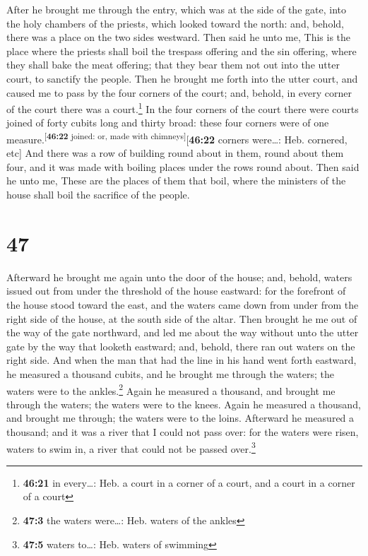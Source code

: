  After he brought me through the entry, which was at the
side of the gate, into the holy chambers of the priests, which looked
toward the north: and, behold, there was a place on the two sides
westward.  Then said he unto me, This is the place where
the priests shall boil the trespass offering and the sin offering, where
they shall bake the meat offering; that they bear them not out into the
utter court, to sanctify the people.  Then he brought me
forth into the utter court, and caused me to pass by the four corners of
the court; and, behold, in every corner of the court there was a
court.\footnote{\textbf{46:21} in every\ldots: Heb. a court in a corner
  of a court, and a court in a corner of a court}  In the
four corners of the court there were courts joined of forty cubits long
and thirty broad: these four corners were of one
measure.\textsuperscript{{[}\textbf{46:22} joined: or, made with
chimneys{]}}{[}\textbf{46:22} corners were\ldots: Heb. cornered, etc{]}
 And there was a row of building round about in them,
round about them four, and it was made with boiling places under the
rows round about.  Then said he unto me, These are the
places of them that boil, where the ministers of the house shall boil
the sacrifice of the people.

\hypertarget{section-46}{%
\section{47}\label{section-46}}

 Afterward he brought me again unto the door of the house;
and, behold, waters issued out from under the threshold of the house
eastward: for the forefront of the house stood toward the east, and the
waters came down from under from the right side of the house, at the
south side of the altar.  Then brought he me out of the
way of the gate northward, and led me about the way without unto the
utter gate by the way that looketh eastward; and, behold, there ran out
waters on the right side.  And when the man that had the
line in his hand went forth eastward, he measured a thousand cubits, and
he brought me through the waters; the waters were to the
ankles.\footnote{\textbf{47:3} the waters were\ldots: Heb. waters of the
  ankles}  Again he measured a thousand, and brought me
through the waters; the waters were to the knees. Again he measured a
thousand, and brought me through; the waters were to the loins.
 Afterward he measured a thousand; and it was a river that
I could not pass over: for the waters were risen, waters to swim in, a
river that could not be passed over.\footnote{\textbf{47:5} waters
  to\ldots: Heb. waters of swimming}

